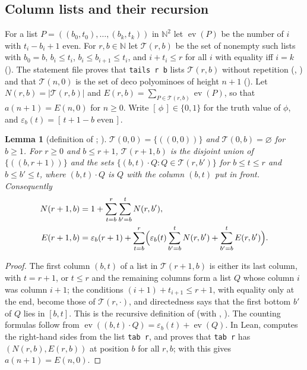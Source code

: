 \documentclass[11pt]{amsart}
\theoremstyle{plain}
\newtheorem{lemma}[theorem]{Lemma}
\theoremstyle{definition}
\newcommand{\N}{\mathbb{N}}
\newcommand{\ev}{\operatorname{ev}}
\newcommand{\cT}{\mathcal{T}}
\newcommand{\Iv}[1]{[\,#1\,]}
\begin{document}
\subsection{Column lists and their recursion}
For a list $P=((b_0,t_0),\dots,(b_k,t_k))$ in $\N^2$ let $\ev(P)$ be the number of $i$ with $t_i-b_i+1$ even. For $r,b\in\N$ let $\cT(r,b)$ be the set of nonempty such lists with $b_0=b$, $b_i\le t_i$, $b_i\le b_{i+1}\le t_i$, and $i+t_i\le r$ for all $i$ with equality iff $i=k$ (). The statement file proves that \texttt{tails r b} lists $\cT(r,b)$ without repetition (, ) and that $\cT(n,0)$ is the set of deco polyominoes of height $n+1$ (). Let $N(r,b)=|\cT(r,b)|$ and $E(r,b)=\sum_{P\in\cT(r,b)}\ev(P)$, so that $a(n+1)=E(n,0)$ for $n\ge0$. Write $\Iv{\phi}\in\{0,1\}$ for the truth value of $\phi$, and $\varepsilon_b(t)=\Iv{t+1-b\text{ even}}$.

\begin{lemma}[definition of ; ]\label{lem:rec}
$\cT(0,0)=\{((0,0))\}$ and $\cT(0,b)=\varnothing$ for $b\ge1$. For $r\ge0$ and $b\le r+1$, $\cT(r+1,b)$ is the disjoint union of $\{((b,r+1))\}$ and the sets $\{(b,t)\cdot Q: Q\in\cT(r,b')\}$ for $b\le t\le r$ and $b\le b'\le t$, where $(b,t)\cdot Q$ is $Q$ with the column $(b,t)$ put in front. Consequently
\begin{align*}
  N(r+1,b)&=1+\sum_{t=b}^{r}\sum_{b'=b}^{t}N(r,b'),\\
  E(r+1,b)&=\varepsilon_b(r+1)+\sum_{t=b}^{r}\Bigl(\varepsilon_b(t)\sum_{b'=b}^{t}N(r,b')+\sum_{b'=b}^{t}E(r,b')\Bigr).
\end{align*}
\end{lemma}

\begin{proof}
The first column $(b,t)$ of a list in $\cT(r+1,b)$ is either its last column, with $t=r+1$, or $t\le r$ and the remaining columns form a list $Q$ whose column $i$ was column $i+1$; the conditions $(i+1)+t_{i+1}\le r+1$, with equality only at the end, become those of $\cT(r,\cdot)$, and directedness says that the first bottom $b'$ of $Q$ lies in $[b,t]$. This is the recursive definition of  (with , ). The counting formulas follow from $\ev((b,t)\cdot Q)=\varepsilon_b(t)+\ev(Q)$. In Lean,  computes the right-hand sides from the list \texttt{tab r}, and  proves that \texttt{tab r} has $(N(r,b),E(r,b))$ at position $b$ for all $r,b$; with  this gives $a(n+1)=E(n,0)$.
\end{proof}
\end{document}
